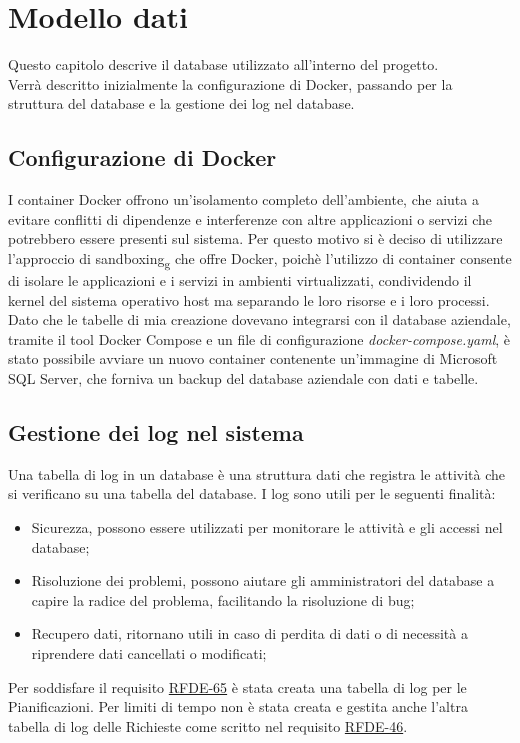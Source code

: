 \chapter{Modello dati}
\label{cap:database}
Questo capitolo descrive il database utilizzato all'interno del progetto.\\
Verrà descritto inizialmente la configurazione di Docker, passando per la struttura del database e la gestione dei log nel database.\\

\section{Configurazione di Docker}
I container Docker offrono un'isolamento completo dell'ambiente, che aiuta a evitare conflitti di dipendenze e interferenze con altre applicazioni o servizi che potrebbero essere presenti sul sistema. Per questo motivo si è deciso di utilizzare l'approccio di sandboxing\textsubscript{g} che offre Docker, poichè l'utilizzo di container consente di isolare le applicazioni e i servizi in ambienti virtualizzati, condividendo il kernel del sistema operativo host ma separando le loro risorse e i loro processi.\\
Dato che le tabelle di mia creazione dovevano integrarsi con il database aziendale, tramite il tool Docker Compose e un file di configurazione \textit{docker-compose.yaml}, è stato possibile avviare un nuovo container contenente un'immagine di Microsoft SQL Server, che forniva un backup del database aziendale con dati e tabelle.\\



\section{Gestione dei log nel sistema}
Una tabella di log in un database è una struttura dati che registra le attività che si verificano su una tabella del database. I log sono utili per le seguenti finalità:
\begin{itemize}
\item Sicurezza, possono essere utilizzati per monitorare le attività e gli accessi nel database;
\item Risoluzione dei problemi, possono aiutare gli amministratori del database a capire la radice del problema, facilitando la risoluzione di bug;
\item Recupero dati, ritornano utili in caso di perdita di dati o di necessità a riprendere dati cancellati o modificati;
\end{itemize} 
Per soddisfare il requisito \hyperlink{rf65}{RFDE-65} è stata creata una tabella di log per le Pianificazioni.
Per limiti di tempo non è stata creata e gestita anche l'altra tabella di log delle Richieste come scritto nel requisito \hyperlink{rf46}{RFDE-46}.\\
